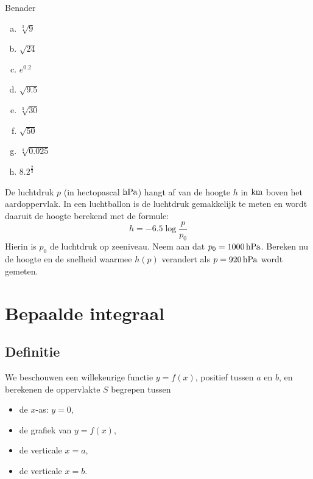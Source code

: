 \documentclass[a4paper,12pt, twoside]{article}
\begin{document}
\begin{oefening}
Benader
\begin{multicols}{3}
\begin{enumerate}[(a)]
  \itemsep.5em
  \item $\displaystyle \sqrt[3]{9}$
  \item $\displaystyle \sqrt{24}$
  \item $\displaystyle e^{0.2}$
  \item $\displaystyle \sqrt{9.5}$
  \item $\displaystyle \sqrt[3]{30}$
  \item $\displaystyle \sqrt{50}$
  \item $\displaystyle \sqrt[4]{0.025}$
  \item $\displaystyle 8.2^\frac{2}{3}$
\end{enumerate}
\end{multicols}
\end{oefening}

\begin{oefening} %
De luchtdruk $p$ (in hectopascal $\hPa$) hangt af van de hoogte $h$ in $\km$ boven het aardoppervlak. In een luchtballon is de luchtdruk gemakkelijk te meten en wordt daaruit de hoogte berekend met de formule:
$$h = -6.5 \log \frac{p}{p_0}$$
Hierin is $p_0$ de luchtdruk op zeeniveau. Neem aan dat $p_0 = 1000 \hPa$.
Bereken nu de hoogte en de snelheid waarmee $h(p)$ verandert als $p = 920 \hPa$ wordt gemeten.
\end{oefening}

\cleardoublepage
\section{Bepaalde integraal}

\subsection{Definitie}

We beschouwen een willekeurige functie $y=f(x)$, positief tussen $a$ en $b$, en berekenen de oppervlakte $S$ begrepen tussen
\begin{itemize}
  \item de $x$-as: $y=0$,
  \item de grafiek van $y=f(x)$,
  \item de verticale $x=a$,
  \item de verticale $x=b$.
\end{itemize}
\end{document}
